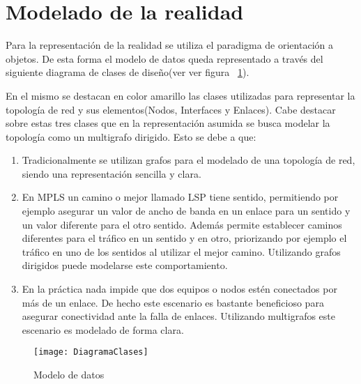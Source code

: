
\section[Modelado de la realidad]{Modelado de la realidad}

Para la representaci\'on de la realidad se utiliza el paradigma de orientaci\'on a objetos. De esta forma el modelo de datos queda representado a través del siguiente diagrama de clases de diseño(ver ver figura ~\ref{fig:ModeloDeDatos}).

En el mismo se destacan en color amarillo las clases utilizadas para representar la topolog\'ia de red y sus elementos(Nodos, Interfaces y Enlaces). Cabe destacar sobre estas tres clases que en la representaci\'on asumida se busca modelar la topolog\'ia como un multigrafo dirigido. Esto se debe a que:

\begin{enumerate}
\item Tradicionalmente se utilizan grafos para el modelado de una topolog\'ia de red, siendo una representaci\'on sencilla y clara.

\item En MPLS un camino o mejor llamado LSP tiene sentido, permitiendo por ejemplo asegurar un valor de ancho de banda en un enlace para un sentido y un valor diferente para el otro sentido. Adem\'as permite establecer caminos diferentes para el tr\'afico en un sentido y en otro, priorizando por ejemplo el tr\'afico  en uno de los sentidos al utilizar el mejor camino. Utilizando grafos dirigidos puede modelarse este comportamiento.

\item En la pr\'actica nada impide que dos equipos o nodos est\'en conectados por m\'as de un enlace. De hecho este escenario es bastante beneficioso para asegurar conectividad ante la falla de enlaces. Utilizando multigrafos este escenario es modelado de forma clara.
  
\end{enumerate}

\begin{figure}[ht!] 
\centering    
\texttt{[image: DiagramaClases]}
\caption[Modelo de datos]{Modelo de datos}
\label{fig:ModeloDeDatos}
\end{figure}

